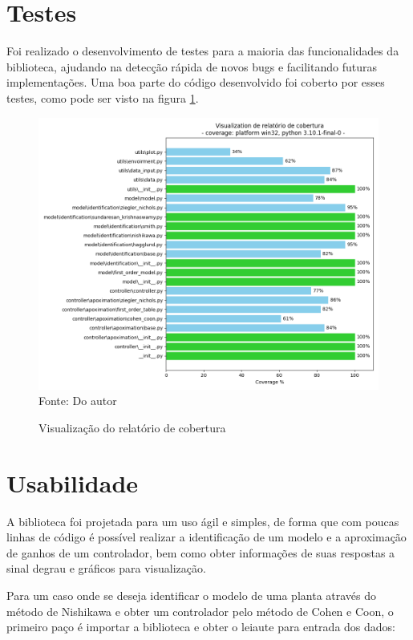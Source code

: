 \section{Testes}

Foi realizado o desenvolvimento de testes para a maioria das funcionalidades da biblioteca, ajudando na detecção
rápida de novos bugs e facilitando futuras implementações.
Uma boa parte do código desenvolvido foi coberto por esses testes, como pode ser visto na figura \ref{fig:coverage}.

\begin{figure}[H]
    \centering
    \caption{Visualização do relatório de cobertura}
    \includegraphics[scale=0.6]{figuras/coverage}
    \label{fig:coverage}
    \\
    \vspace{0cm}\hspace{0cm}\small{Fonte: Do autor}
\end{figure}


\section{Usabilidade}

A biblioteca foi projetada para um uso ágil e simples, de forma que com poucas linhas de código é possível realizar a
identificação de um modelo e a aproximação de ganhos de um controlador, bem como obter informações de suas respostas
a sinal degrau e gráficos para visualização.

Para um caso onde se deseja identificar o modelo de uma planta através do método de Nishikawa e obter um controlador
pelo método de Cohen e Coon, o primeiro paço é importar a biblioteca e obter o leiaute para entrada dos dados:

